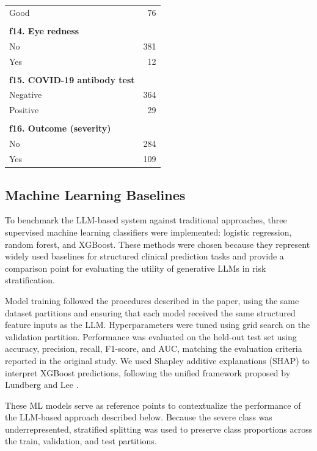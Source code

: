 \begin{longtable}{l r}
\hspace{1em} Good & 76  \\
\\
\textbf{f14. Eye redness} & \\
\hspace{1em} No  & 381 \\
\hspace{1em} Yes & 12  \\
\\
\textbf{f15. COVID-19 antibody test} & \\
\hspace{1em} Negative & 364 \\
\hspace{1em} Positive & 29  \\
\\
\textbf{f16. Outcome (severity)} & \\
\hspace{1em} No  & 284 \\
\hspace{1em} Yes & 109 \\
\end{longtable}

\subsection{Machine Learning Baselines}
To benchmark the LLM-based system against traditional approaches, three supervised machine learning classifiers were implemented: logistic regression, random forest, and XGBoost. These methods were chosen because they represent widely used baselines for structured clinical prediction tasks and provide a comparison point for evaluating the utility of generative LLMs in risk stratification.

Model training followed the procedures described in the paper, using the same dataset partitions and ensuring that each model received the same structured feature inputs as the LLM. Hyperparameters were tuned using grid search on the validation partition. Performance was evaluated on the held-out test set using accuracy, precision, recall, F1-score, and AUC, matching the evaluation criteria reported in the original study. We used Shapley additive explanations (SHAP) to interpret XGBoost predictions, following the unified framework proposed by Lundberg and Lee \cite{lundberg2017unified}.

These ML models serve as reference points to contextualize the performance of the LLM-based approach described below. Because the severe class was underrepresented, stratified splitting was used to preserve class proportions across the train, validation, and test partitions.

